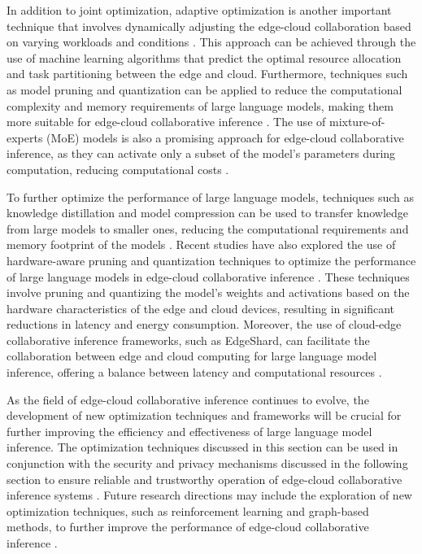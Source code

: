 \documentclass[11pt,a4paper]{article}
\begin{document}
In addition to joint optimization, adaptive optimization is another important technique that involves dynamically adjusting the edge-cloud collaboration based on varying workloads and conditions \cite{doi:10.1109/ojcoms.2023.3280174}. This approach can be achieved through the use of machine learning algorithms that predict the optimal resource allocation and task partitioning between the edge and cloud. Furthermore, techniques such as model pruning and quantization can be applied to reduce the computational complexity and memory requirements of large language models, making them more suitable for edge-cloud collaborative inference \cite{arxiv:2403.03853}. The use of mixture-of-experts (MoE) models is also a promising approach for edge-cloud collaborative inference, as they can activate only a subset of the model's parameters during computation, reducing computational costs \cite{arxiv:2407.00945}.

To further optimize the performance of large language models, techniques such as knowledge distillation and model compression can be used to transfer knowledge from large models to smaller ones, reducing the computational requirements and memory footprint of the models \cite{arxiv:2309.14717}. Recent studies have also explored the use of hardware-aware pruning and quantization techniques to optimize the performance of large language models in edge-cloud collaborative inference \cite{doi:10.1145/3744244}. These techniques involve pruning and quantizing the model's weights and activations based on the hardware characteristics of the edge and cloud devices, resulting in significant reductions in latency and energy consumption. Moreover, the use of cloud-edge collaborative inference frameworks, such as EdgeShard, can facilitate the collaboration between edge and cloud computing for large language model inference, offering a balance between latency and computational resources \cite{arxiv:2405.14371}.

As the field of edge-cloud collaborative inference continues to evolve, the development of new optimization techniques and frameworks will be crucial for further improving the efficiency and effectiveness of large language model inference. The optimization techniques discussed in this section can be used in conjunction with the security and privacy mechanisms discussed in the following section to ensure reliable and trustworthy operation of edge-cloud collaborative inference systems \cite{doi:10.1609/aaai.v37i9.26255}. Future research directions may include the exploration of new optimization techniques, such as reinforcement learning and graph-based methods, to further improve the performance of edge-cloud collaborative inference \cite{arxiv:2411.19146}.
\end{document}
